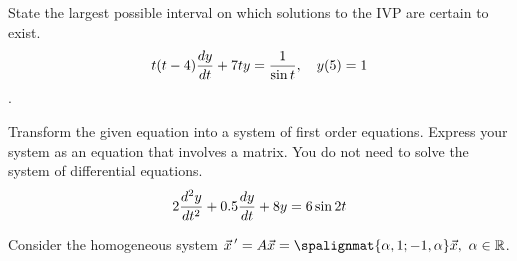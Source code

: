 \documentclass[12pt]{exam}
\begin{document}
\begin{questions}
    
    \newpage \InitialsLeft
    
    \question[2] %
    State the largest possible interval on which solutions to the IVP are certain to exist. $$t(t-4) {\frac{dy}{dt}} + 7t y = \frac{1}{\sin t}, \quad y(5) = 1$$.
    \vspace{5cm}
    

    
    \vspace{3cm}    
    \question[3] %
    Transform the given equation into a system of first order equations. Express your system as an equation that involves a matrix. You do not need to solve the system of differential equations. 
    $$2{\frac{d ^2y}{dt^2}} + 0.5 {\frac{dy}{dt}} +8y = 6\sin 2t$$
    
    \vspace{3cm}
    


    
    \newpage \InitialsRight
    

    
    \question[5] %
    Consider the homogeneous system $\displaystyle \vec x \, ' = A \vec x = \spalignmat{\alpha, 1;-1, \alpha}\vec x, \ \alpha \in \mathbb R$. 
\end{questions}
\end{document}
